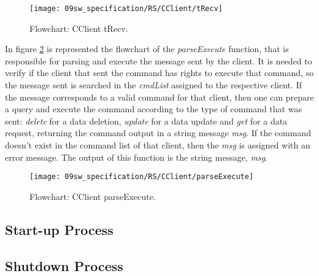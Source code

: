 \begin{figure}[H]
	\centering
	\texttt{[image: 09sw\_specification/RS/CClient/tRecv]}
	\caption{Flowchart: CClient tRecv.}
	\label{fig:RSRecv}
\end{figure}

In figure \ref{fig:parseExecute} is represented the flowchart of the \textit{parseExecute} function, that is responsible for parsing and execute the message sent by the client. It is needed to verify if the client that sent the command has rights to execute that command, so the message sent is searched in the \textit{cmdList} assigned to the respective client. If the message corresponds to a valid command for that client, then one can prepare a query and execute the command according to the type of command that was sent: \textit{delete} for a data deletion, \textit{update} for a data update and \textit{get} for a data request, returning the command output in a string message \textit{msg}. If the command doesn't exist in the command list of that client, then the \textit{msg} is assigned with an error message. The output of this function is the string message, \textit{msg}.

\begin{figure}[H]
	\centering
	\texttt{[image: 09sw\_specification/RS/CClient/parseExecute]}
	\caption{Flowchart: CClient parseExecute.}
	\label{fig:parseExecute}
\end{figure}

\subsection{Start-up Process}

\subsection{Shutdown Process}
